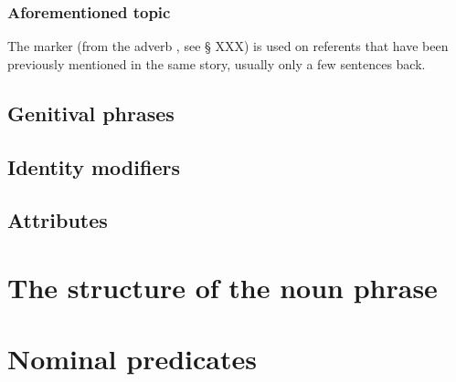  \subsubsection{Aforementioned topic} \label{sec:iCqha}
 The marker  (from the adverb , see § XXX)  is used on referents that have been previously mentioned in the same story, usually only a few sentences back.
 
 
%
%
 
\subsection{Genitival phrases}
%
%
\subsection{Identity modifiers} \label{sec:identity.modifier}

\subsection{Attributes}

\section{The structure of the noun phrase}

\section{Nominal predicates}
